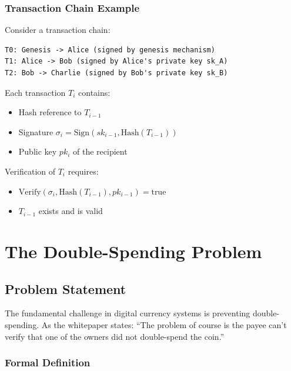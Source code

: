 \subsubsection{Transaction Chain Example}

Consider a transaction chain:

\begin{verbatim}
T0: Genesis -> Alice (signed by genesis mechanism)
T1: Alice -> Bob (signed by Alice's private key sk_A)
T2: Bob -> Charlie (signed by Bob's private key sk_B)
\end{verbatim}

Each transaction $T_i$ contains:
\begin{itemize}
  \item Hash reference to $T_{i-1}$
  \item Signature $\sigma_i = \text{Sign}(sk_{i-1}, \text{Hash}(T_{i-1}))$
  \item Public key $pk_i$ of the recipient
\end{itemize}

Verification of $T_i$ requires:
\begin{itemize}
  \item $\text{Verify}(\sigma_i, \text{Hash}(T_{i-1}), pk_{i-1}) = \text{true}$
  \item $T_{i-1}$ exists and is valid
\end{itemize}


\section{The Double-Spending Problem}
\label{sec:double-spending}

\subsection{Problem Statement}
\label{subsec:ds-problem}

The fundamental challenge in digital currency systems is preventing double-spending. As the whitepaper states: ``The problem of course is the payee can't verify that one of the owners did not double-spend the coin.''

\subsubsection{Formal Definition}

